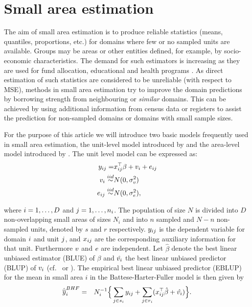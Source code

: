 \documentclass[article]{ajs}
\begin{document}
\section{Small area estimation}
\label{sec:SAE}

The aim of small area estimation is to produce reliable statistics (means, quantiles, proportions, etc.) for domains where few or no sampled units are available. Groups may be areas or other entities defined, for example, by socio-economic characteristics. The demand for such estimators is increasing as they are used for fund allocation, educational and health programs \citep{pfeffermann13}. As direct estimation of such statistics are considered to be unreliable (with respect to MSE), methods in small area estimation try to improve the domain predictions by borrowing strength from neighbouring or \textit{similar} domains. This can be achieved by using additional information from census data or registers to assist the prediction for non-sampled domains or domains with small sample sizes. 

For the purpose of this article we will introduce two basic models frequently used in small area estimation, the unit-level model introduced by \cite{battese88} and the area-level model introduced by \cite{fay79}. The unit level model \citep{battese88} can be expressed as:
\begin{eqnarray}
	 y_{ij} =& x_{ij}^\top\beta + v_{i} + e_{ij} \nonumber \\
	v_{i} \stackrel{iid}{\sim}& N(0, \sigma_v^2)  \nonumber \\
	e_{ij} \stackrel{iid}{\sim}& N(0, \sigma_e^2) \nonumber,
\end{eqnarray}

where $i = 1, \dots, D$ and $j = 1, \dots, n_i$. The population of size $N$ is divided into $D$ non-overlapping small areas of sizes $N_i$ and into $n$ sampled and $N-n$ non-sampled units, denoted by $s$ and $r$ respectively. $y_{ij}$ is the dependent variable for domain $i$ and unit $j$, and $x_{ij}$ are the corresponding auxiliary information for that unit. Furthermore $v$ and $e$ are independent. Let $\hat{\beta}$ denote the best linear unbiased estimator (BLUE) of $\beta$ and $\hat{v_{i}}$ the best linear unbiased predictor (BLUP) of $v_{i}$ (cf.\ \citealp{Hen50} or \citealp{Sea71}). The empirical best linear unbiased predictor (EBLUP) for the mean in small area $i$ in the Battese-Harter-Fuller model is then given by
\begin{eqnarray}\label{BHFEBLUP}\hat{\overline{y}}_i^{BHF}&=&N_i^{-1}\Big\{\sum_{j\in s_i}y_{ij}+\sum_{j\in r_i}(x_{ij}^\top\hat{{\beta}}+\hat{v_{i}})\Big\}.
\end{eqnarray}
\end{document}
